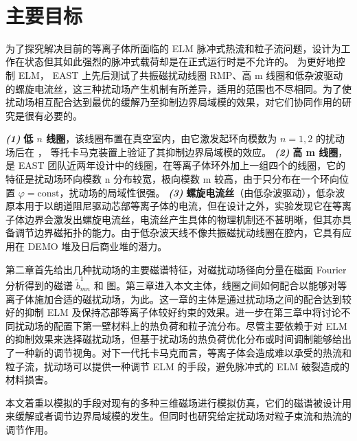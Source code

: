 

​\section{主要目标}
为了探究解决目前的\Hmode 等离子体所面临的 ELM 脉冲式热流和粒子流问题，\iter 设计为工作在\Hmode 状态但其如此强烈的脉冲式载荷却是在正式运行时是不允许的。
为更好地控制 ELM， EAST 上先后测试了共振磁扰动线圈 RMP、高 m 线圈和低杂波驱动的螺旋电流丝，这三种扰动场产生机制有所差异，适用的范围也不尽相同。为了使扰动场相互配合达到最优的缓解乃至抑制边界局域模的效果，对它们协同作用的研究是很有必要的。

\textit{\textbf{(1)}} \textbf{低 $n$ 线圈}，该线圈布置在真空室内，由它激发起环向模数为 $n=1,2$ 的扰动场后在 \east， \ddd 等托卡马克装置上验证了其抑制边界局域模的效应。 
\textit{\textbf{(2)}} \textbf{高 m 线圈}，是 EAST 团队近两年设计中的线圈，在等离子体环外加上一组四个的线圈，它的特征是扰动场环向模数 n 分布较宽，极向模数 m 较高，由于只分布在一个环向位置 $\varphi=\text{const}$，扰动场的局域性很强。 
\textit{\textbf{(3)}} \textbf{螺旋电流丝}（由低杂波驱动），低杂波原本用于以朗道阻尼驱动芯部等离子体的电流，但在设计之外，实验发现它在等离子体边界会激发出螺旋电流丝，电流丝产生具体的物理机制还不甚明晰，但其亦具备调节边界磁拓扑的能力。由于低杂波天线不像共振磁扰动线圈在腔内，它具有应用在 DEMO 堆及日后商业堆的潜力。

第二章首先给出几种扰动场的主要磁谱特征，对磁扰动场径向分量在磁面 Fourier 分析得到的磁谱 $\tilde{b}^1_{mn}$ 和 \Poincare 图。第三章进入本文主体，线圈之间如何配合以能够对等离子体施加合适的磁扰动场，为此。这一章的主体是通过扰动场之间的配合达到较好的抑制 ELM 及保持芯部等离子体较好约束的效果。进一步在第三章中将讨论不同扰动场的配置下第一壁材料上的热负荷和粒子流分布。尽管主要依赖于对 ELM 的抑制效果来选择磁扰动场，但基于扰动场的热负荷优化分布或时间调制能够给出了一种新的调节视角。对下一代托卡马克而言，\Hmode 等离子体会造成难以承受的热流和粒子流，扰动场可以提供一种调节 ELM 的手段，避免脉冲式的 ELM 破裂造成的材料损害。

本文着重以模拟的手段对现有的多种三维磁场进行模拟仿真，它们的磁谱被设计用来缓解或者调节边界局域模的发生。但同时也研究给定扰动场对粒子束流和热流的调节作用。
